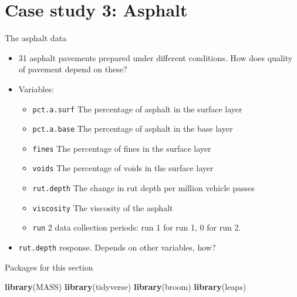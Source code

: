 \documentclass[
  ignorenonframetext,
]{beamer}
\newenvironment{Shaded}{\begin{snugshade}}{\end{snugshade}}
\newcommand{\KeywordTok}[1]{\textcolor[rgb]{0.13,0.29,0.53}{\textbf{#1}}}
\newcommand{\NormalTok}[1]{#1}
\providecommand{\tightlist}{%
  \setlength{\itemsep}{0pt}\setlength{\parskip}{0pt}}
\begin{document}
\hypertarget{case-study-3-asphalt}{%
\section{Case study 3: Asphalt}\label{case-study-3-asphalt}}

\begin{frame}[fragile]{The asphalt data}
\protect\hypertarget{the-asphalt-data}{}

\begin{itemize}
\tightlist
\item
  31 asphalt pavements prepared under different conditions. How does
  quality of pavement depend on these?
\item
  Variables:

  \begin{itemize}
  \tightlist
  \item
    \texttt{pct.a.surf} The percentage of asphalt in the surface layer
  \item
    \texttt{pct.a.base} The percentage of asphalt in the base layer
  \item
    \texttt{fines} The percentage of fines in the surface layer
  \item
    \texttt{voids} The percentage of voids in the surface layer
  \item
    \texttt{rut.depth} The change in rut depth per million vehicle
    passes
  \item
    \texttt{viscosity} The viscosity of the asphalt
  \item
    \texttt{run} 2 data collection periods: run 1 for run 1, 0 for run
    2.
  \end{itemize}
\item
  \texttt{rut.depth} response. Depends on other variables, how?
\end{itemize}

\end{frame}

\begin{frame}[fragile]{Packages for this section}
\protect\hypertarget{packages-for-this-section-6}{}

\begin{Shaded}
\begin{Highlighting}[]
\KeywordTok{library}\NormalTok{(MASS)}
\KeywordTok{library}\NormalTok{(tidyverse)}
\KeywordTok{library}\NormalTok{(broom)}
\KeywordTok{library}\NormalTok{(leaps)}
\end{Highlighting}
\end{Shaded}

\end{frame}
\end{document}
